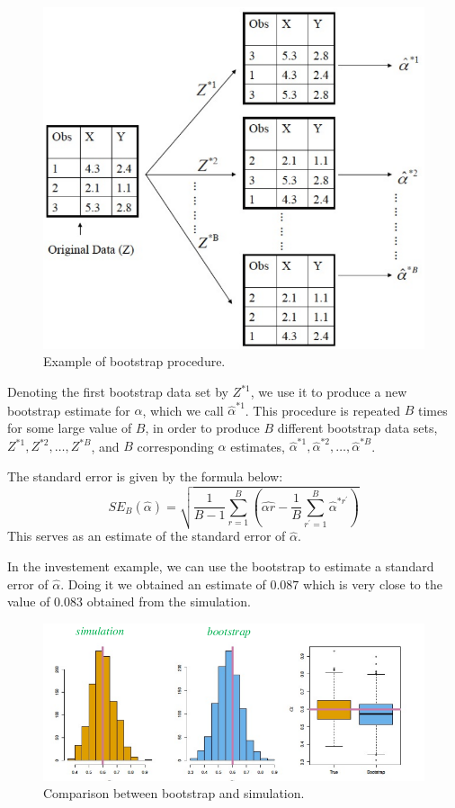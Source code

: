 \begin{figure}[ht]
    \centering
    \includegraphics[width=0.8\linewidth]{./figures/chapter_4/lec_15_bootstrap.png}
    \caption{Example of bootstrap procedure.}
    \label{fig:lec_15_bootstrap}

\end{figure}

Denoting the first bootstrap data set by $Z^{\ast 1}$, we use it to produce a new bootstrap estimate for $\alpha$, which we call $\hat{\alpha}^{\ast 1}$. This procedure is repeated $B$ times for some large value of $B$, in order to produce $B$ different bootstrap data sets, $Z^{\ast 1}, Z^{\ast 2}, \dots, Z^{\ast B}$, and $B$ corresponding $\alpha$ estimates, $\hat{\alpha}^{\ast 1}, \hat{\alpha}^{\ast 2}, \dots, \hat{\alpha}^{\ast B}$.

The standard error is given by the formula below:
\[
    SE_B(\hat{\alpha}) = \sqrt{\frac{1}{B-1} \sum_{r=1}^{B} \left(\hat{\alpha r} - \frac{1}{B} \sum_{r^{\prime} =1}^{B} \hat{\alpha}^{\ast r^{\prime} }\right)}
\]
This serves as an estimate of the standard error of $\hat{\alpha}$.

In the investement example, we can use the bootstrap to estimate a standard error of $\hat{\alpha}$. Doing it we obtained an estimate of $0.087$ which is very close to the value of $0.083$ obtained from the simulation.

\begin{figure}[ht]
    \centering
    \includegraphics[width=0.8\linewidth]{./figures/chapter_4/lec_15_bootstrap_2.png}
    \caption{Comparison between bootstrap and simulation.}
    \label{fig:lec_15_bootstrap_2}

\end{figure}

